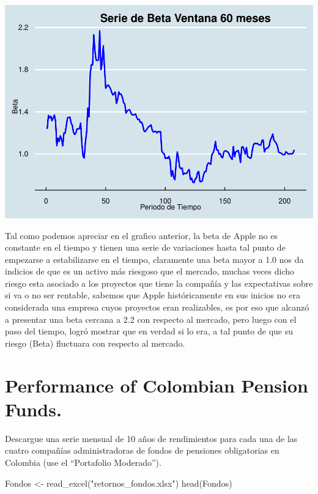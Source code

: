 \documentclass[
  12pt,
]{article}
\newenvironment{Shaded}{\begin{snugshade}}{\end{snugshade}}
\newcommand{\FunctionTok}[1]{\textcolor[rgb]{0.00,0.00,0.00}{#1}}
\newcommand{\NormalTok}[1]{#1}
\newcommand{\OtherTok}[1]{\textcolor[rgb]{0.56,0.35,0.01}{#1}}
\newcommand{\StringTok}[1]{\textcolor[rgb]{0.31,0.60,0.02}{#1}}
\begin{document}
\begin{center}\includegraphics[width=0.95\linewidth]{figurasR/unnamed-chunk-16-1} \end{center}

Tal como podemos apreciar en el grafico anterior, la beta de Apple no es
constante en el tiempo y tienen una serie de variaciones hasta tal punto
de empezarse a estabilizarse en el tiempo, claramente una beta mayor a
1.0 nos da indicios de que es un activo más riesgoso que el mercado,
muchas veces dicho riesgo esta asociado a los proyectos que tiene la
compañía y las expectativas sobre si va o no ser rentable, sabemos que
Apple históricamente en sus inicios no era considerada una empresa cuyos
proyectos eran realizables, es por eso que alcanzó a presentar una beta
cercana a 2.2 con respecto al mercado, pero luego con el paso del
tiempo, logró mostrar que en verdad si lo era, a tal punto de que su
riesgo (Beta) fluctuara con respecto al mercado.

\hypertarget{performance-of-colombian-pension-funds.}{%
\section{Performance of Colombian Pension
Funds.}\label{performance-of-colombian-pension-funds.}}

Descargue una serie mensual de 10 años de rendimientos para cada una de
las cuatro compañías administradoras de fondos de pensiones obligatorias
en Colombia (use el ``Portafolio Moderado'').

\begin{Shaded}
\begin{Highlighting}[]
\NormalTok{Fondos }\OtherTok{\textless{}{-}} \FunctionTok{read\_excel}\NormalTok{(}\StringTok{"retornos\_fondos.xlsx"}\NormalTok{)}
\FunctionTok{head}\NormalTok{(Fondos)}
\end{Highlighting}
\end{Shaded}
\end{document}
